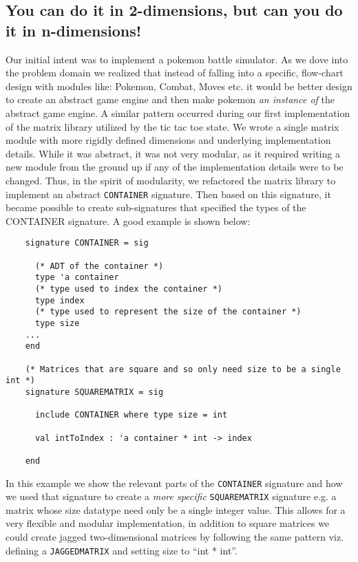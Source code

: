 \documentclass[9pt,letterpaper]{extarticle}
\begin{document}
  \subsection{You can do it in 2-dimensions, but can you do it in n-dimensions!}
  Our initial intent was to implement a pokemon battle simulator. As we
  dove into the problem domain we realized that instead of falling into a
  specific, flow-chart design with modules like: Pokemon, Combat, Moves etc. it
  would be better design to create an abstract game engine and then make pokemon
  \textit{an instance of} the abstract game engine. A similar pattern occurred
  during our first implementation of the matrix library utilized by the tic tac
  toe state. We wrote a single matrix module with more rigidly defined 
  dimensions and underlying implementation details. While it was abstract, it was not very modular,
  as it required writing a new module from the ground up if any of the 
  implementation details were to be changed. Thus, in the spirit of modularity, we refactored the matrix
  library to implement an abstract \texttt{CONTAINER} signature. Then based on
  this signature, it became possible to create sub-signatures that specified the
  types of the CONTAINER signature. A good example is shown below:

  \begin{verbatim}
    signature CONTAINER = sig
    
      (* ADT of the container *)
      type 'a container
      (* type used to index the container *)
      type index
      (* type used to represent the size of the container *)
      type size
    ...
    end

    (* Matrices that are square and so only need size to be a single int *)
    signature SQUAREMATRIX = sig
    
      include CONTAINER where type size = int
    
      val intToIndex : 'a container * int -> index
    
    end

  \end{verbatim}
  In this example we show the relevant parts of the \texttt{CONTAINER} signature
  and how we used that signature to create a \textit{more specific}
  \texttt{SQUAREMATRIX} signature e.g. a matrix whose size datatype need only be
  a single integer value. This allows for a very flexible and modular
  implementation, in addition to square matrices we could create jagged two-dimensional matrices
  by following the same pattern viz. defining a \texttt{JAGGEDMATRIX} and
  setting size to ``int * int''.
\end{document}

